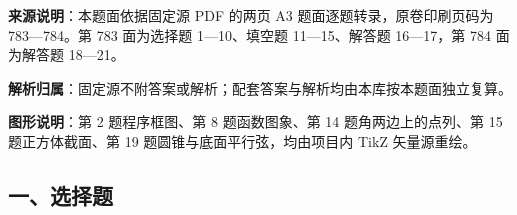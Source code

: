 

\begin{gknotice}
\textbf{来源说明}：本题面依据固定源 PDF 的两页 A3 题面逐题转录，原卷印刷页码为 783—784。第 783 面为选择题 1—10、填空题 11—15、解答题 16—17，第 784 面为解答题 18—21。

\textbf{解析归属}：固定源不附答案或解析；配套答案与解析均由本库按本题面独立复算。

\textbf{图形说明}：第 2 题程序框图、第 8 题函数图象、第 14 题角两边上的点列、第 15 题正方体截面、第 19 题圆锥与底面平行弦，均由项目内 TikZ 矢量源重绘。
\end{gknotice}

\begingroup
\renewcommand{\gkpart}[1]{\Needspace{0.2\textheight}\subsection*{#1}\nopagebreak}
\gkpart{一、选择题}
\endgroup

